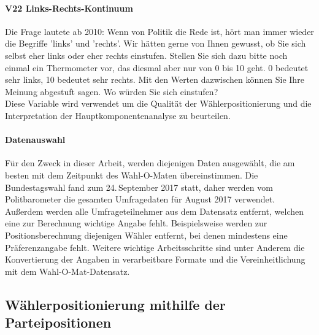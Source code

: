 \paragraph{V22 Links-Rechts-Kontinuum}
Die Frage lautete ab 2010: \glqq Wenn von Politik die Rede ist, hört man immer wieder die Begriﬀe 'links' und 'rechts'. Wir hätten gerne von Ihnen gewusst, ob Sie sich selbst eher links oder eher rechts einstufen. Stellen Sie sich	dazu bitte noch einmal ein Thermometer vor, das diesmal aber nur von 0 bis 10 geht. 0 bedeutet sehr links, 10 bedeutet sehr rechts. Mit den Werten dazwischen können Sie Ihre Meinung abgestuft sagen. Wo würden Sie sich einstufen?\grqq \citep[Variablendokumentation, S.\,61-62]{politbarometer}\\
Diese Variable wird verwendet um die Qualität der Wählerpositionierung  und die Interpretation der Hauptkomponentenanalyse zu beurteilen.

\paragraph{Datenauswahl}
Für den Zweck in dieser Arbeit, werden diejenigen Daten ausgewählt, die am besten mit dem Zeitpunkt des Wahl-O-Maten übereinstimmen.
Die Bundestagswahl fand zum 24.\,September 2017 statt, daher werden vom Politbarometer die gesamten Umfragedaten für August 2017 verwendet.
Außerdem werden alle Umfrageteilnehmer aus dem Datensatz entfernt, welchen eine zur Berechnung wichtige Angabe fehlt.
Beispielsweise werden zur Positionsberechnung diejenigen Wähler entfernt, bei denen mindestens eine Präferenzangabe fehlt.
Weitere wichtige Arbeitsschritte sind unter Anderem die Konvertierung der Angaben in verarbeitbare Formate und die Vereinheitlichung mit dem Wahl-O-Mat-Datensatz.

\subsection{Wählerpositionierung mithilfe der Parteipositionen}


